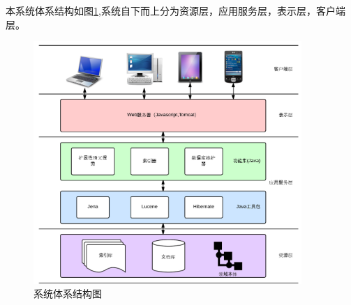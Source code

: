 \documentclass[12pt,a4paper]{article}
\begin{document}
	本系统体系结构如图\ref{fig:体系结构},系统自下而上分为资源层，应用服务层，表示层，客户端层。
	
	\begin{figure}[htbp] 
	\centering\includegraphics[width=4in]{fig/SystemStructure.png} 
	\caption{系统体系结构图}\label{fig:体系结构} 
	\end{figure} 
	
\end{document}
